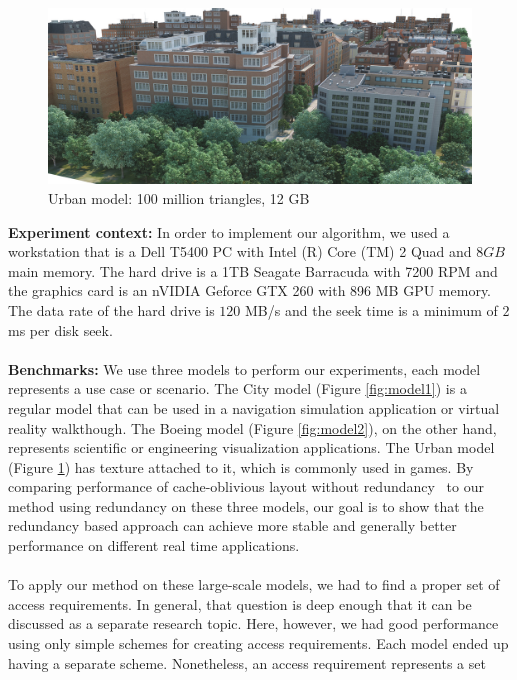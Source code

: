 \begin{figure}[ht]
  \centering
  \includegraphics[width=\columnwidth]{densecity.jpg}
  \caption{Urban model: 100 million triangles, 12 GB }
  \label{fig:model3}
\end{figure}


\textbf{Experiment context:}
In order to implement our algorithm, we used a workstation that is a Dell T5400 PC with Intel (R) Core (TM) 2 Quad and $8GB$ main memory. The hard drive is a 1TB Seagate Barracuda with 7200 RPM and the graphics card is an nVIDIA Geforce GTX 260 with 896 MB GPU memory. The data rate of the hard drive is $120$ MB/s and the seek time is a minimum of $2$ ms per disk seek.\\
\\
\textbf{Benchmarks:}
We use three models to perform our experiments, each model represents a use
case or scenario. The City model (Figure \ref{fig:model1}) is a regular model
that can be used in a navigation simulation application or virtual reality
walkthough. The Boeing model (Figure \ref{fig:model2}), on the other hand,
represents scientific or engineering visualization applications. The Urban
model (Figure \ref{fig:model3}) has texture attached to it, which is commonly
used in games. By comparing performance of cache-oblivious layout without
redundancy~\cite{cacheobliviouslayout} to our method using redundancy on these three models, our goal
is to show that the redundancy based approach can achieve more stable and generally
better performance on different real time applications. \\
\\ To apply our method on these large-scale models, we had to find a proper set
of access requirements. In general, that question is deep enough that it can be
discussed as a separate research topic. Here, however, we had good performance
using only simple schemes for creating access requirements. Each model ended up
having a separate scheme. Nonetheless, an access requirement represents a set
